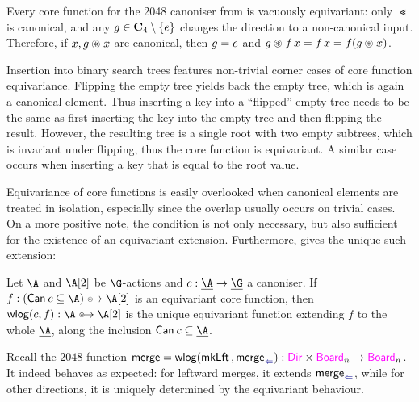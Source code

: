 \begin{example}
  Every core function for the 2048 canoniser from  is vacuously equivariant: only $\Lt$ is
  canonical, and any $g \in \Cyc{4}\setminus\set\unit$ changes the
  direction to a non-canonical input. Therefore, if $x, g \act x$ are
  canonical, then $g = \unit$ and $g \act f\,x = f\,x = f(g \act x)$.

  Insertion into binary search trees features non-trivial corner cases
  of core function equivariance. Flipping the empty tree yields back the
  empty tree, which is again a canonical element. Thus inserting a key
  into a ``flipped'' empty tree needs to be the same as first inserting
  the key into the empty tree and then flipping the result. However, the
  resulting tree is a single root with two empty subtrees, which is
  invariant under flipping, thus the core function is equivariant.
  A similar case occurs when inserting a key that is equal to the root value.
\end{example}

Equivariance of core functions is easily overlooked when canonical
elements are treated in isolation, especially since the overlap
usually occurs on trivial cases. On a more positive note, the
condition is not only necessary, but also sufficient for the existence
of an equivariant extension. Furthermore, \WLOG{} gives the unique
such extension:

\begin{theorem}
  Let $\A$ and $\B$ be $\G$-actions and $\canoniser : \carrier\A \to
  \carrier\G$ a canoniser. If $f : (\Canon\canoniser \subseteq \A)
  \equito \B$ is an equivariant core function, then $\wlg(c,f) : \A
  \equito \B$ is the unique equivariant function extending $f$ to the
  whole $\carrier\A$, along the inclusion $\Canon\canoniser \subset \carrier\A$.
\end{theorem}

\begin{example}
  Recall the $2048$ function
  $\merge = \wlg(\mkLt, \mergeLeft) : \Direction \times \Board n \to
  \Board n$.
  It indeed behaves as expected: for leftward merges, it
  extends $\mergeLeft$, while for other directions, it is uniquely
  determined by the equivariant behaviour.
\end{example}

